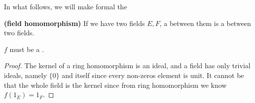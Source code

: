 \documentclass{article}
\newcommand{\bfs}[1]{\textbf{({#1}) }}
\begin{document}
In what follows, we will make formal the 
\begin{defa}\bfs{field homomorphism}
If we have two fields $E, F$, a  between them is a  between two fields.
\end{defa}
\begin{lema}\label{lem:dnmadfr}
  $f$ must be a . 
\end{lema}
\begin{proof}
The kernel of a ring homomorphism is an ideal, and a field has only trivial ideals, namely $\{0\}$ and itself since every non-zeros element is unit. It cannot be that the whole field is the kernel since from ring homomorphism we know $f(1_E)=1_F$.
\end{proof}
\end{document}
